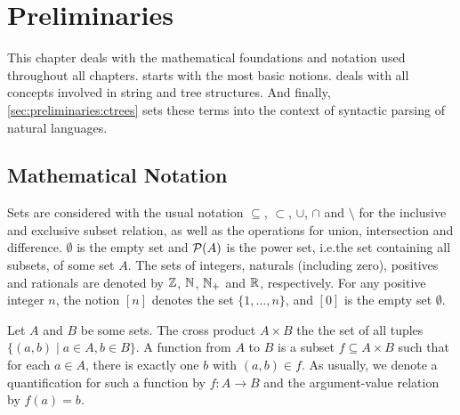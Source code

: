 \documentclass[../document.tex]{subfiles}
\begin{document}

    \chapter{Preliminaries}\label{chap:preliminaries}
    This chapter deals with the mathematical foundations and notation used throughout all chapters.
     starts with the most basic notions.
     deals with all concepts involved in string and tree structures.
    And finally, \cref{sec:preliminaries:ctrees} sets these terms into the context of syntactic parsing of natural languages.


    \section{Mathematical Notation}\label{sec:preliminaries:math}
    Sets are considered with the usual notation \(\subseteq\), \(\subset\), \(\cup\), \(\cap\) and \(\setminus\) for the inclusive and exclusive subset relation, as well as the operations for union, intersection and difference.
    \(\emptyset\) is the empty set and \(\mathcal{P}(A)\) is the power set, i.e.\@ the set containing all subsets, of some set \(A\).
    The sets of integers, naturals (including zero), positives and rationals are denoted by $\mathbb{Z}$, $\mathbb{N}$, $\mathbb{N}_+$ and $\mathbb{R}$, respectively.
    For any positive integer \(n\), the notion \([n]\) denotes the set \(\{1, \ldots, n\}\), and \([0]\) is the empty set \(\emptyset\).

    Let \(A\) and \(B\) be some sets.
    The cross product \(A \times B\) the the set of all tuples \(\{(a,b) \mid a \in A, b\in B\}\).
    A function from \(A\) to \(B\) is a subset \(f \subseteq A \times B\) such that for each \(a \in A\), there is exactly one \(b\) with \((a,b) \in f\).
    As usually, we denote a quantification for such a function by \(f\colon A \to B\) and the argument-value relation by \(f(a) = b\).
\end{document}
